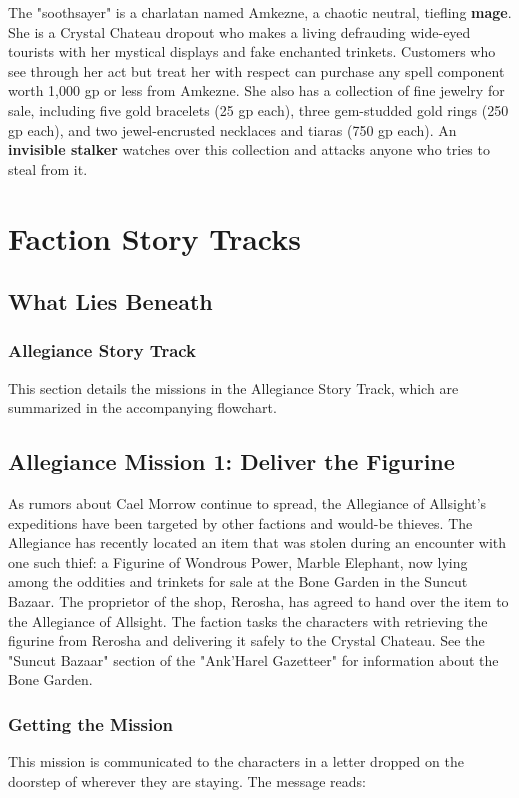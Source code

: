 \documentclass[10pt,a4paper,twoside,bg=print,twocolumn,openany,nodeprecatedcode]{dndbook}
\begin{document}
The "soothsayer" is a charlatan named Amkezne, a chaotic neutral, tiefling \textbf{mage}. She is a Crystal Chateau dropout who makes a living defrauding wide-eyed tourists with her mystical displays and fake enchanted trinkets. Customers who see through her act but treat her with respect can purchase any spell component worth 1,000 gp or less from Amkezne. She also has a collection of fine jewelry for sale, including five gold bracelets (25 gp each), three gem-studded gold rings (250 gp each), and two jewel-encrusted necklaces and tiaras (750 gp each). An \textbf{invisible stalker} watches over this collection and attacks anyone who tries to steal from it.

\section{Faction Story Tracks}
\subsection{What Lies Beneath}
\subsubsection{Allegiance Story Track}
This section details the missions in the Allegiance Story Track, which are summarized in the accompanying flowchart.

\subsection{Allegiance Mission 1: Deliver the Figurine}
As rumors about Cael Morrow continue to spread, the Allegiance of Allsight's expeditions have been targeted by other factions and would-be thieves. The Allegiance has recently located an item that was stolen during an encounter with one such thief: a Figurine of Wondrous Power, Marble Elephant, now lying among the oddities and trinkets for sale at the Bone Garden in the Suncut Bazaar. The proprietor of the shop, Rerosha, has agreed to hand over the item to the Allegiance of Allsight. The faction tasks the characters with retrieving the figurine from Rerosha and delivering it safely to the Crystal Chateau. See the "Suncut Bazaar" section of the "Ank'Harel Gazetteer" for information about the Bone Garden.

\subsubsection{Getting the Mission}
This mission is communicated to the characters in a letter dropped on the doorstep of wherever they are staying. The message reads:
\end{document}
